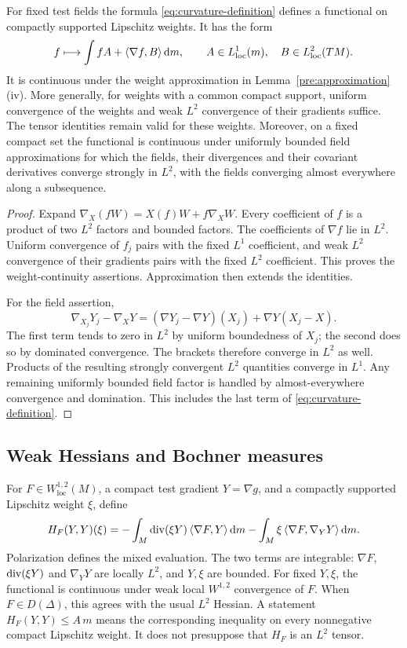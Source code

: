 \begin{lemma}
\label{pre:tensor-continuity}
For fixed test fields the formula
\eqref{eq:curvature-definition} defines a functional on compactly
supported Lipschitz weights. It has the form
\[
f\longmapsto\int fA+\langle\nabla f,B\rangle\,\mathrm d m,
\qquad A\in L^1_{\rm loc}(m),\quad B\in L^2_{\rm loc}(TM).
\]
It is continuous under the weight approximation in
Lemma~\ref{pre:approximation}\textup{(iv)}.
More generally, for weights with a common compact support,
uniform convergence of the weights and weak \(L^2\) convergence
of their gradients suffice.
The tensor identities remain valid for these weights.
Moreover, on a fixed compact set the functional is continuous
under uniformly bounded field approximations for which the fields,
their divergences and their covariant derivatives converge
strongly in \(L^2\), with the fields converging almost everywhere
along a subsequence.
\end{lemma}

\begin{proof}
Expand \(\nabla_X(fW)=X(f)W+f\nabla_XW\).
Every coefficient of \(f\) is a product of two \(L^2\) factors
and bounded factors. The coefficients of \(\nabla f\) lie in
\(L^2\). Uniform convergence of \(f_j\) pairs with the fixed
\(L^1\) coefficient, and weak \(L^2\) convergence of their
gradients pairs with the fixed \(L^2\) coefficient.
This proves the weight-continuity assertions.
Approximation then extends the identities.

For the field assertion,
\[
\nabla_{X_j}Y_j-\nabla_XY
=(\nabla Y_j-\nabla Y)(X_j)+\nabla Y(X_j-X).
\]
The first term tends to zero in \(L^2\) by uniform boundedness
of \(X_j\); the second does so by dominated convergence.
The brackets therefore converge in \(L^2\) as well.
Products of the resulting strongly convergent \(L^2\) quantities
converge in \(L^1\). Any remaining uniformly bounded field factor
is handled by almost-everywhere convergence and domination.
This includes the last term of
\eqref{eq:curvature-definition}.
\end{proof}

\subsection{Weak Hessians and Bochner measures}

For \(F\in W^{1,2}_{\mathrm{loc}}(M)\), a compact test gradient \(Y=\nabla g\),
and a compactly supported Lipschitz weight \(\xi\), define
\begin{equation}
\label{eq:weak-hessian}
H_F(Y,Y)(\xi)
=-\int_M\operatorname{div}(\xi Y)\,\langle\nabla F,Y\rangle\,\mathrm d m
-\int_M\xi\,\langle\nabla F,\nabla_YY\rangle\,\mathrm d m.
\end{equation}
Polarization defines the mixed evaluation.
The two terms are integrable: \(\nabla F\), \(\operatorname{div}(\xi Y)\)
and \(\nabla_YY\) are locally \(L^2\), and \(Y,\xi\) are bounded.
For fixed \(Y,\xi\), the functional is continuous under weak
local \(W^{1,2}\) convergence of \(F\).
When \(F\in D(\Delta)\), this agrees with the usual \(L^2\)
Hessian. A statement \(H_F(Y,Y)\le A\,m\) means the
corresponding inequality on every nonnegative compact Lipschitz
weight. It does not presuppose that \(H_F\) is an \(L^2\) tensor.

